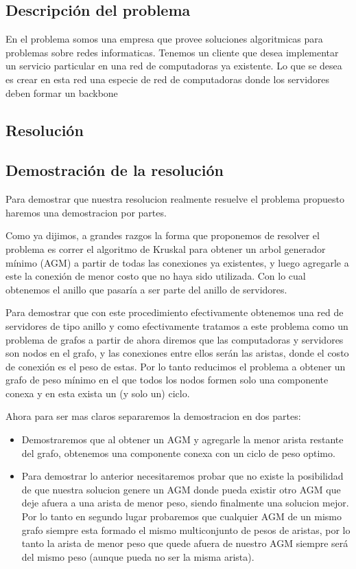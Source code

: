 \subsection{Descripci\'on del problema}

En el problema somos una empresa que provee soluciones algoritmicas para problemas sobre redes informaticas. Tenemos un cliente que desea implementar un servicio particular en una red de computadoras ya existente.
Lo que se desea es crear en esta red una especie de red de computadoras donde los servidores deben formar un backbone 

\subsection{Resoluci\'on}



\subsection{Demostraci\'on de la resoluci\'on}

Para demostrar que nuestra resolucion realmente resuelve el problema propuesto haremos una demostracion por partes.

Como ya dijimos, a grandes razgos la forma que proponemos de resolver el problema es correr el algoritmo de Kruskal para obtener un arbol generador mínimo (AGM) a partir de todas las conexiones ya existentes, y luego agregarle a este la conexión de menor costo que no haya sido utilizada. Con lo cual obtenemos el anillo que pasaría a ser parte del anillo de servidores.

Para demostrar que con este procedimiento efectivamente obtenemos una red de servidores de tipo anillo y como efectivamente tratamos a este problema como un problema de grafos a partir de ahora diremos que las computadoras y servidores son nodos en el grafo, y las conexiones entre ellos serán las aristas, donde el costo de conexión es el peso de estas. Por lo tanto reducimos el problema a obtener un grafo de peso mínimo en el que todos los nodos formen solo una componente conexa y en esta exista un (y solo un) ciclo.

Ahora para ser mas claros separaremos la demostracion en dos partes:

\begin{itemize}
\item Demostraremos que al obtener un AGM y agregarle la menor arista restante del grafo, obtenemos una componente conexa con un ciclo de peso optimo.
\item Para demostrar lo anterior necesitaremos probar que no existe la posibilidad de que nuestra solucion genere un AGM donde pueda existir otro AGM que deje afuera a una arista de menor peso, siendo finalmente una solucion mejor. Por lo tanto en segundo lugar probaremos que cualquier AGM de un mismo grafo siempre esta formado el mismo multiconjunto de pesos de aristas, por lo tanto la arista de menor peso que quede afuera de nuestro AGM siempre será del mismo peso (aunque pueda no ser la misma arista).
\end{itemize}

